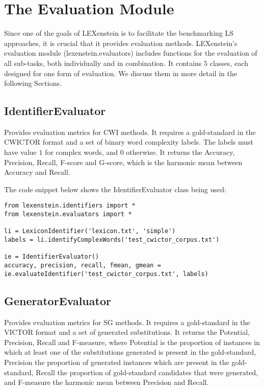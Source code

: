 \chapter{The Evaluation Module}

Since one of the goals of LEXenstein is to facilitate the benchmarking LS approaches, it is crucial that it provides evaluation methods. LEXenstein's evaluation module (lexenstein.evaluators) includes functions for the evaluation of all sub-tasks, both individually and in combination. It contains $5$ classes, each designed for one form of evaluation. We discuss them in more detail in the following Sections.









\section{IdentifierEvaluator}

Provides evaluation metrics for CWI methods. It requires a gold-standard in the CWICTOR format and a set of binary word complexity labels. The labels must have value $1$ for complex words, and $0$ otherwise. It returns the Accuracy, Precision, Recall, F-score and G-score, which is the harmonic mean between Accuracy and Recall.

The code snippet below shows the IdentifierEvaluator class being used:

\begin{lstlisting}
from lexenstein.identifiers import *
from lexenstein.evaluators import *

li = LexiconIdentifier('lexicon.txt', 'simple')
labels = li.identifyComplexWords('test_cwictor_corpus.txt')

ie = IdentifierEvaluator()
accuracy, precision, recall, fmean, gmean = ie.evaluateIdentifier('test_cwictor_corpus.txt', labels)
\end{lstlisting}













\section{GeneratorEvaluator}

Provides evaluation metrics for SG methods. It requires a gold-standard in the VICTOR format and a set of generated substitutions. It returns the Potential, Precision, Recall and F-measure, where Potential is the proportion of instances in which at least one of the substitutions generated is present in the gold-standard, Precision the proportion of generated instances which are present in the gold-standard, Recall the proportion of gold-standard candidates that were generated, and F-measure the harmonic mean between Precision and Recall.

